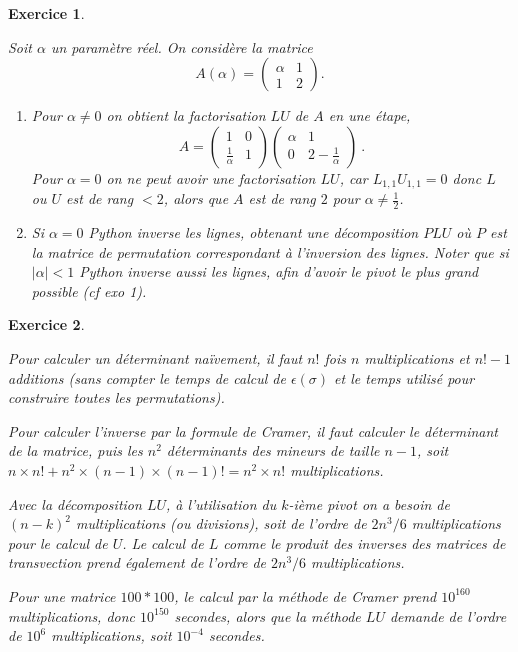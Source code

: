 \documentclass[10pt,a4paper]{article}
\newcommand{\abs}[1]{{\left|{#1}\right|}}
\newtheorem{exer}{Exercice}
\def\bexer{\begin{exer}\begin{em}}\def\eexer{\end{em}\end{exer}}
\begin{document}
\bexer
Soit $\alpha$ un param\`etre r\'eel.
On consid\`ere la matrice
$$
A(\alpha)=
\left(
\begin{array}{ccc}
 \alpha & 1 \\
1&2
\end{array}
\right)
.$$
\begin{enumerate}
\item Pour $\alpha\neq 0$ on obtient la factorisation $LU$ de $A$ en une étape, 
\[
A= \begin{pmatrix} 1 &0 \\ \frac{1}{\alpha} & 1 \end{pmatrix} \begin{pmatrix} \alpha & 1 \\ 0 & 2-\frac{1}{\alpha} \end{pmatrix}~.
\]
Pour $\alpha=0$ on ne peut avoir une factorisation $LU$, car $L_{1, 1}U_{1, 1}=0$ donc $L$ ou $U$ est de rang $<2$, alors que $A$ est de rang $2$ pour $\alpha\neq \frac{1}{2}$.
\item Si $\alpha=0$ Python inverse les lignes, obtenant une décomposition $PLU$ où $P$ est la matrice de permutation correspondant à l'inversion des lignes. Noter que si $\abs{\alpha}<1$ Python inverse aussi les lignes, afin d'avoir le pivot le plus grand possible (cf exo 1).
\end{enumerate}
\eexer






\bexer Pour calculer un déterminant naïvement, il faut $n!$ fois $n$ multiplications et $n!-1$ additions (sans compter le temps de calcul de $\epsilon(\sigma)$ et le temps utilisé pour construire toutes les permutations).

Pour calculer l'inverse par la formule de Cramer, il faut calculer le déterminant 
de la matrice, puis les $n^2$ déterminants des mineurs de taille $n-1$, soit 
$n\times n!+n^2\times(n-1)\times(n-1)!=n^2\times n!$ multiplications.

Avec la décomposition $LU$, à l'utilisation du $k$-ième pivot on a besoin de $(n-k)^2$ multiplications (ou divisions), soit de l'ordre de $2 n^3/6$ multiplications pour le calcul de $U$. Le calcul de $L$ comme le produit des inverses des matrices de transvection prend également de l'ordre de $2n^3/6$ multiplications.

Pour une matrice $100*100$, le calcul par la méthode de Cramer prend $10^{160}$ multiplications, donc $10^{150}$ secondes, alors que la méthode $LU$ demande de l'ordre de $10^6$ multiplications, soit $10^{-4}$ secondes. 
\eexer
\end{document}
